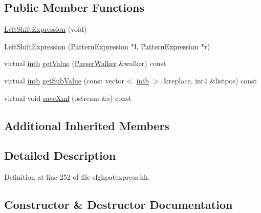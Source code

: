 \subsection*{Public Member Functions}
\begin{DoxyCompactItemize}
\item 
\mbox{\hyperlink{class_left_shift_expression_a56e74133d7369053524b30d7292c2b6d}{Left\+Shift\+Expression}} (void)
\item 
\mbox{\hyperlink{class_left_shift_expression_a6526f7824e9f0f1acc56f80d417c7336}{Left\+Shift\+Expression}} (\mbox{\hyperlink{class_pattern_expression}{Pattern\+Expression}} $\ast$l, \mbox{\hyperlink{class_pattern_expression}{Pattern\+Expression}} $\ast$r)
\item 
virtual \mbox{\hyperlink{types_8h_aa925ba3e627c2df89d5b1cfe84fb8572}{intb}} \mbox{\hyperlink{class_left_shift_expression_a5d12d4e5dd1ae8ce9bc88695b9bdf736}{get\+Value}} (\mbox{\hyperlink{class_parser_walker}{Parser\+Walker}} \&walker) const
\item 
virtual \mbox{\hyperlink{types_8h_aa925ba3e627c2df89d5b1cfe84fb8572}{intb}} \mbox{\hyperlink{class_left_shift_expression_a7c77ac72cf7367db152a535bb07bb2dd}{get\+Sub\+Value}} (const vector$<$ \mbox{\hyperlink{types_8h_aa925ba3e627c2df89d5b1cfe84fb8572}{intb}} $>$ \&replace, int4 \&listpos) const
\item 
virtual void \mbox{\hyperlink{class_left_shift_expression_a2ddfd821596bb45f2c1b5fcd4ca2f764}{save\+Xml}} (ostream \&s) const
\end{DoxyCompactItemize}
\subsection*{Additional Inherited Members}


\subsection{Detailed Description}


Definition at line 252 of file slghpatexpress.\+hh.



\subsection{Constructor \& Destructor Documentation}
\mbox{\label{class_left_shift_expression_a56e74133d7369053524b30d7292c2b6d}} 
